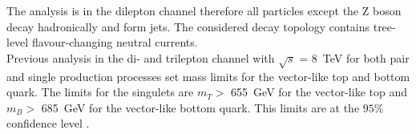 The analysis is in the dilepton channel therefore all particles except the Z boson decay hadronically and form jets. 
The considered decay topology contains tree-level flavour-changing neutral currents.\\
Previous analysis in the di- and trilepton channel with $\sqrt{s}$ = \SI{8}{TeV} for both pair and single production processes set mass limits for the vector-like top and bottom quark\cite{8tevanalysis}. 
The limits for the singulets are $m_{T} >$ \SI{655}{GeV} for the vector-like top and $m_{B} >$ \SI{685}{GeV} for the vector-like bottom quark.  
This limits are at the $95 \%$ confidence level \cite{confidencelevel}.
 










